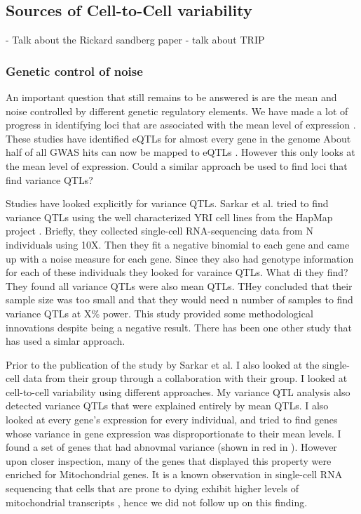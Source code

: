 \subsection{Sources of Cell-to-Cell variability}
- Talk about the Rickard sandberg paper
- talk about TRIP

\subsubsection{Genetic control of noise}
An important question that still remains to be answered is are the mean and noise controlled by different genetic regulatory elements.
We have made a lot of progress in identifying loci that are associated with the mean level of expression \cite{gtex_consortium_genetic_2017} \cite{eqtlgen} \cite{more}. These studies have identified eQTLs for almost every gene in the genome \cite{} About half of all GWAS hits can now be mapped to eQTLs \cite{}. However this only looks at the mean level of expression. Could a similar approach be used to find loci that find variance QTLs?

Studies have looked explicitly for variance QTLs. Sarkar et al. tried to find variance QTLs using the well characterized YRI cell lines from the HapMap project \cite{hapmap}. Briefly, they collected single-cell RNA-sequencing data from N individuals using 10X. Then they fit a negative binomial to each gene and came up with a noise measure for each gene. Since they also had genotype information for each of these individuals they looked for varaince QTLs. What di they find? They found all variance QTLs were also mean QTLs. THey concluded that their sample size was too small and that they would need n number of samples to find variance QTLs at X\% power. This study provided some methodological innovations despite being a negative result. There has been one other study that has used a simlar approach.

Prior to the publication of the study by Sarkar et al. I also looked at the single-cell data from their group through a collaboration with their group. I looked at cell-to-cell variability using different approaches. My variance QTL analysis also detected variance QTLs that were explained entirely by mean QTLs. I also looked at every gene's expression for every individual, and tried to find genes whose variance in gene expression was disproportionate to their mean levels. I found a set of genes that had abnovmal variance (shown in red in ). However upon closer inspection, many of the genes that displayed this property were enriched for Mitochondrial genes. It is a known observation in single-cell 
RNA sequencing that cells that are prone to dying exhibit higher levels of mitochondrial transcripts \cite {seurat}, hence we did not follow up on this finding.

